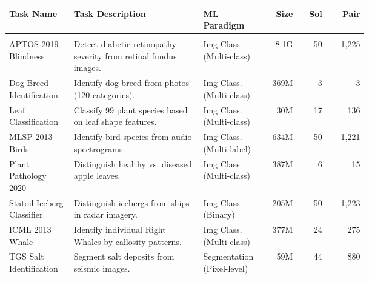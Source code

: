 

\begin{table}
    \centering
    \footnotesize
    
    \begin{tabular}{
        >{\raggedright\arraybackslash}p{0.18\linewidth} 
        >{\raggedright\arraybackslash}p{0.36\linewidth} 
        >{\raggedright\arraybackslash}p{0.15\linewidth} 
        r r r
    }
    \toprule
    \textbf{Task Name} & \textbf{Task Description} & \textbf{ML Paradigm} & \textbf{Size} & \textbf{Sol} & \textbf{Pair} \\
    \midrule

    \multicolumn{6}{l}{\cellcolor{gray!15}\textbf{\textit{Computer Vision Domain}}} \\
    \midrule
    APTOS 2019 Blindness & Detect diabetic retinopathy severity from retinal fundus images. & Img Class. (Multi-class) & 8.1G & 50 & 1,225 \\ \addlinespace
    
    Dog Breed Identification & Identify dog breed from photos (120 categories). & Img Class. (Multi-class) & 369M & 3 & 3 \\ \addlinespace
    
    Leaf Classification & Classify 99 plant species based on leaf shape features. & Img Class. (Multi-class) & 30M & 17 & 136 \\ \addlinespace
    
    MLSP 2013 Birds & Identify bird species from audio spectrograms. & Img Class. (Multi-label) & 634M & 50 & 1,221 \\ \addlinespace
    
    Plant Pathology 2020 & Distinguish healthy vs. diseased apple leaves. & Img Class. (Multi-class) & 387M & 6 & 15 \\ \addlinespace
    
    Statoil Iceberg Classifier & Distinguish icebergs from ships in radar imagery. & Img Class. (Binary) & 205M & 50 & 1,223 \\ \addlinespace
    
    ICML 2013 Whale & Identify individual Right Whales by callosity patterns. & Img Class. (Multi-class) & 377M & 24 & 275 \\ \addlinespace
    
    TGS Salt Identification & Segment salt deposits from seismic images. & Segmentation (Pixel-level) & 59M & 44 & 880 \\ \addlinespace
    

\end{tabular}
\end{table}
